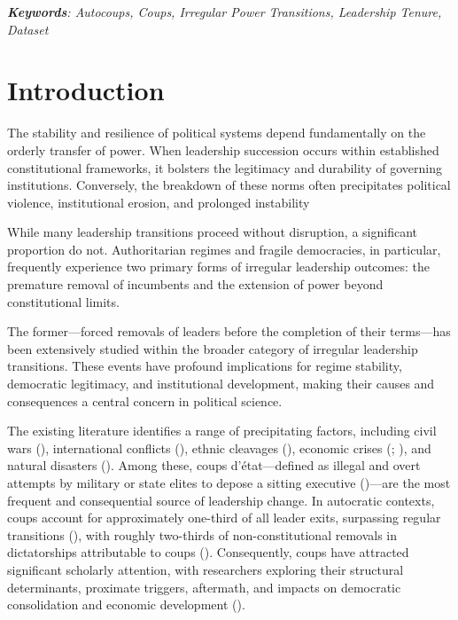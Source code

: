 \documentclass[
  12pt,
]{report}
\begin{document}
\emph{\textbf{Keywords}: Autocoups, Coups, Irregular Power Transitions,
Leadership Tenure, Dataset}

\section{Introduction}\label{introduction-1}

The stability and resilience of political systems depend fundamentally
on the orderly transfer of power. When leadership succession occurs
within established constitutional frameworks, it bolsters the legitimacy
and durability of governing institutions. Conversely, the breakdown of
these norms often precipitates political violence, institutional
erosion, and prolonged instability

While many leadership transitions proceed without disruption, a
significant proportion do not. Authoritarian regimes and fragile
democracies, in particular, frequently experience two primary forms of
irregular leadership outcomes: the premature removal of incumbents and
the extension of power beyond constitutional limits.

The former---forced removals of leaders before the completion of their
terms---has been extensively studied within the broader category of
irregular leadership transitions. These events have profound
implications for regime stability, democratic legitimacy, and
institutional development, making their causes and consequences a
central concern in political science.

The existing literature identifies a range of precipitating factors,
including civil wars (), international conflicts (), ethnic cleavages
(),
economic crises (;
), and natural
disasters (). Among these, coups d'état---defined as illegal and overt
attempts by military or state elites to depose a sitting executive
()---are the most
frequent and consequential source of leadership change. In autocratic
contexts, coups account for approximately one-third of all leader exits,
surpassing regular transitions (), with roughly two-thirds of non-constitutional removals in
dictatorships attributable to coups (). Consequently, coups have attracted significant scholarly
attention, with researchers exploring their structural determinants,
proximate triggers, aftermath, and impacts on democratic consolidation
and economic development ().
\end{document}
